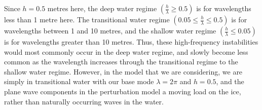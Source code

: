 \documentclass{article}
\begin{document}
Since \(h = 0.5\) metres here, the deep water regime \((\frac{h}{\lambda} \geq 0.5)\) is for wavelengths less than 1 metre here. The transitional water regime \((0.05 \leq \frac{h}{\lambda} \leq 0.5)\) is for wavelengths between 1 and 10 metres, and the shallow water regime \((\frac{h}{\lambda} \leq 0.05)\) is for wavelengths greater than 10 metres. Thus, these high-frequency instabilities would most commonly occur in the deep water regime, and slowly become less common as the wavelength increases through the transitional regime to the shallow water regime. However, in the model that we are considering, we are simply in transitional water with our base mode \(\lambda = 2 \pi\) and \(h = 0.5\), and the plane wave components in the perturbation model a moving load on the ice, rather than naturally occurring waves in the water. 
\end{document}
